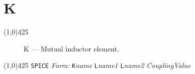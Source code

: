 \oddsidemargin 10mm \topmargin 0.0in \textwidth 5.5in \textheight
7.375in \evensidemargin 1.0in \headheight 0.18in \footskip 0.16in
%
\section[K \- Mutual Inductor]{ \hspace{70mm}\huge\textbf{K}}
\linethickness{1mm}
\line(1,0){425}
\normalsize
\begin{figure}[h]
\centerline{\epsfxsize=2in} \caption{K --- Mutual
inductor element.}
\end{figure}
\newline
\linethickness{0.5mm} \line(1,0){425}
\newline
\texttt{SPICE} \textit{Form:}
\newline
{\tt K}{\it name} {\tt L}{\it name1} {\tt L}{\it name2} {\it
CouplingValue}
\newline
